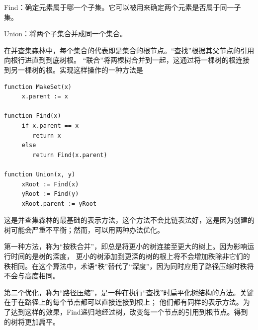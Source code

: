 Find：确定元素属于哪一个子集。它可以被用来确定两个元素是否属于同一子集。

Union：将两个子集合并成同一个集合。

在并查集森林中，每个集合的代表即是集合的根节点。“查找”根据其父节点的引用向根行进直到到底树根。
“联合”将两棵树合并到一起，这通过将一棵树的根连接到另一棵树的根。实现这样操作的一种方法是

\begin{lstlisting}
function MakeSet(x)
     x.parent := x

function Find(x)
     if x.parent == x
        return x
     else
        return Find(x.parent)

function Union(x, y)
     xRoot := Find(x)
     yRoot := Find(y)
     xRoot.parent := yRoot
\end{lstlisting}

这是并查集森林的最基础的表示方法，这个方法不会比链表法好，这是因为创建的树可能会严重不平衡；然而，可以用两种办法优化。

第一种方法，称为“按秩合并”，即总是将更小的树连接至更大的树上。因为影响运行时间的是树的深度，
更小的树添加到更深的树的根上将不会增加秩除非它们的秩相同。在这个算法中，术语“秩”替代了“深度”，因为同时应用了路径压缩时秩将不会与高度相同。

第二个优化，称为“路径压缩”，是一种在执行“查找”时扁平化树结构的方法。关键在于在路径上的每个节点都可以直接连接到根上；
他们都有同样的表示方法。为了达到这样的效果，Find递归地经过树，改变每一个节点的引用到根节点。得到的树将更加扁平。
